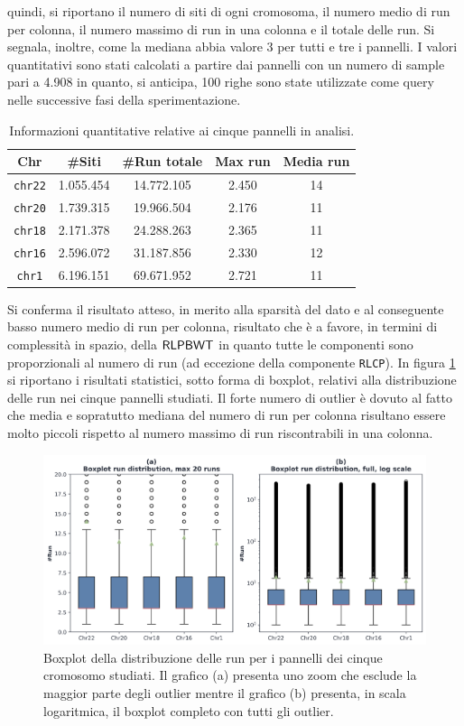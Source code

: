 quindi, si riportano il numero di siti di ogni cromosoma, il 
numero medio di run per colonna, il numero 
massimo di run in una colonna e il totale delle run. Si segnala, inoltre,
come la
mediana abbia valore 3 per tutti e tre i pannelli. I valori quantitativi sono
stati calcolati a partire dai pannelli con un numero di sample pari a 4.908 in
quanto, si anticipa, 100 righe sono state utilizzate come query nelle successive
fasi della sperimentazione.
\begin{table}
  \centering
  \caption{Informazioni quantitative relative ai cinque pannelli in analisi.}
  \label{tab:panel}
  \begin{tabular}{c||c|c|c|c}
    \textbf{Chr} & \textbf{\#Siti} & \textbf{\#Run totale}
    & \textbf{Max run} & \textbf{Media run} \\ 
    \hline
    \texttt{chr22} & 1.055.454 & 14.772.105 & 2.450 & 14\\
    \texttt{chr20} & 1.739.315 & 19.966.504 & 2.176 & 11\\
    \texttt{chr18} & 2.171.378 & 24.288.263 & 2.365 & 11\\
    \texttt{chr16} & 2.596.072 & 31.187.856 & 2.330 & 12\\
    \texttt{chr1} & 6.196.151 & 69.671.952 & 2.721 & 11\\
  \end{tabular}
\end{table}
Si conferma il risultato atteso, in merito alla sparsità del dato e al
conseguente basso numero medio di run per colonna, risultato che è a favore, in
termini di 
complessità in spazio, della $\mbox{\rm {\sf RLPBWT}}$ in quanto tutte le componenti sono
proporzionali al numero di run (ad eccezione della componente \texttt{RLCP}). In
figura 
\ref{fig:boxplot} si riportano i risultati statistici, sotto forma di
boxplot, relativi alla distribuzione delle run nei cinque pannelli
studiati. Il forte numero di outlier è dovuto al fatto che media e sopratutto
mediana del numero di run per colonna risultano essere molto piccoli rispetto al
numero massimo di run riscontrabili in una colonna.
\begin{figure}
  \centering
  \includegraphics[width = \linewidth]{img/boxplotbi.png}
  \caption{Boxplot della distribuzione delle run per i pannelli dei cinque
    cromosomo studiati. Il grafico (a) presenta uno zoom che esclude la maggior
    parte degli outlier mentre il grafico (b) presenta, in scala logaritmica, il
    boxplot completo con tutti gli outlier.}
  \label{fig:boxplot}
\end{figure}
